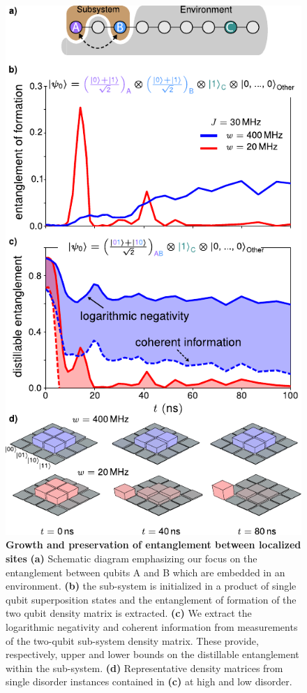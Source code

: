\begin{figure}[tb!]
    \centering
        \includegraphics[width=89 mm, keepaspectratio]{./PDF/f6_190716_1129a.pdf}
        \caption{\small
        \textbf{Growth and preservation of entanglement between localized sites}
        \textbf{(a)} Schematic diagram emphasizing our focus on the entanglement between qubits A and B which are embedded in an environment.
        \textbf{(b)}  the sub-system is initialized in a product of single qubit superposition states and the entanglement of formation of the two qubit density matrix is extracted.
        \textbf{(c)} 
        We extract the logarithmic negativity and coherent information from measurements of the two-qubit sub-system density matrix.
        These provide, respectively, upper and lower bounds on the distillable entanglement within the sub-system.
        \textbf{(d)} Representative density matrices from single disorder instances contained in \textbf{(c)} at high and low disorder.
        }
        \label{fig_5}
\end{figure}
\afterpage{\FloatBarrier}

